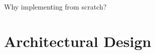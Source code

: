 \documentclass[9pt]{beamer}
\begin{document}
\begin{frame}[fragile]{Why implementing from scratch? }
\begin{itemize}
        
        
    
        

    
    \end{itemize}


    
\end{frame}



\section{Architectural Design}

\end{document}
